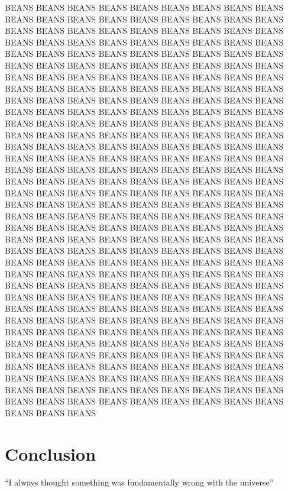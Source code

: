 \documentclass{article}
\begin{document}
 BEANS BEANS BEANS BEANS BEANS BEANS BEANS BEANS BEANS BEANS BEANS BEANS BEANS BEANS BEANS BEANS BEANS BEANS BEANS BEANS BEANS BEANS BEANS BEANS BEANS BEANS BEANS BEANS BEANS BEANS BEANS BEANS BEANS BEANS BEANS BEANS BEANS BEANS BEANS BEANS BEANS BEANS BEANS BEANS BEANS BEANS BEANS BEANS BEANS BEANS BEANS BEANS BEANS BEANS BEANS BEANS BEANS BEANS BEANS BEANS BEANS BEANS BEANS BEANS BEANS BEANS BEANS BEANS BEANS BEANS BEANS BEANS BEANS BEANS BEANS BEANS BEANS BEANS BEANS BEANS BEANS BEANS BEANS BEANS BEANS BEANS BEANS BEANS BEANS BEANS BEANS BEANS BEANS BEANS BEANS BEANS BEANS BEANS BEANS BEANS BEANS BEANS BEANS BEANS BEANS BEANS BEANS BEANS BEANS BEANS BEANS BEANS BEANS BEANS BEANS BEANS BEANS BEANS BEANS BEANS BEANS BEANS BEANS BEANS BEANS BEANS BEANS BEANS BEANS BEANS BEANS BEANS BEANS BEANS BEANS BEANS BEANS BEANS BEANS BEANS BEANS BEANS BEANS BEANS BEANS BEANS BEANS BEANS BEANS BEANS BEANS BEANS BEANS BEANS BEANS BEANS BEANS BEANS BEANS BEANS BEANS BEANS BEANS BEANS BEANS BEANS BEANS BEANS BEANS BEANS BEANS BEANS BEANS BEANS BEANS BEANS BEANS BEANS BEANS BEANS BEANS BEANS BEANS BEANS BEANS BEANS BEANS BEANS BEANS BEANS BEANS BEANS BEANS BEANS BEANS BEANS BEANS BEANS BEANS BEANS BEANS BEANS BEANS BEANS BEANS BEANS BEANS BEANS BEANS BEANS BEANS BEANS BEANS BEANS BEANS BEANS BEANS BEANS BEANS BEANS BEANS BEANS BEANS BEANS BEANS BEANS BEANS BEANS BEANS BEANS BEANS BEANS BEANS BEANS BEANS BEANS BEANS BEANS BEANS BEANS BEANS BEANS BEANS BEANS BEANS BEANS BEANS BEANS BEANS BEANS BEANS BEANS BEANS BEANS BEANS BEANS BEANS BEANS BEANS BEANS BEANS BEANS BEANS BEANS BEANS BEANS BEANS BEANS BEANS BEANS BEANS BEANS BEANS BEANS BEANS BEANS BEANS BEANS BEANS BEANS BEANS BEANS BEANS BEANS BEANS BEANS BEANS BEANS BEANS BEANS BEANS BEANS BEANS BEANS BEANS BEANS BEANS BEANS BEANS BEANS BEANS BEANS BEANS BEANS BEANS BEANS BEANS BEANS BEANS BEANS BEANS BEANS BEANS BEANS BEANS BEANS BEANS BEANS

\section{Conclusion}
``I always thought something was fundamentally wrong with the universe'' \citep{adams1995hitchhiker}



\end{document}
